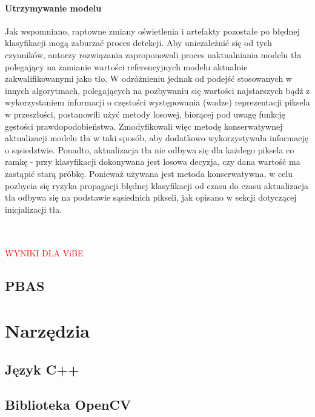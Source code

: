 \paragraph{Utrzymywanie modelu \\}
Jak wspomniano, raptowne zmiany oświetlenia i artefakty pozostałe po błędnej klasyfikacji mogą zaburzać proces detekcji. Aby uniezależnić się od tych czynników, autorzy rozwiązania zaproponowali proces uaktualniania modelu tła polegający na zamianie wartości referencyjnych modelu aktualnie zakwalifikowanymi jako tło. W odróżnieniu jednak od podejść stosowanych w innych algorytmach, polegających na pozbywaniu się wartości najstarszych bądź z wykorzystaniem informacji o częstości występowania (wadze) reprezentacji piksela w przeszłości, postanowili użyć metody losowej, biorącej pod uwagę funkcję gęstości prawdopodobieństwa. Zmodyfikowali więc metodę konserwatywnej aktualizacji modelu tła w taki sposób, aby dodatkowo wykorzystywała informację o sąsiedztwie. Ponadto, aktualizacja tła nie odbywa się dla każdego piksela co ramkę - przy klasyfikacji dokonywana jest losowa decyzja, czy dana wartość ma zastąpić starą próbkę. Ponieważ używana jest metoda konserwatywna, w celu pozbycia się ryzyka propagacji błędnej klasyfikacji od czasu do czasu aktualizacja tła odbywa się na podstawie sąsiednich pikseli, jak opisano w sekcji dotyczącej inicjalizacji tła.\\ \\ \\
\begin{LARGE}
\textcolor{red}{WYNIKI DLA ViBE}
\end{LARGE}
\subsection{PBAS}
\cite{hofmann2012background}
\section{Narzędzia}
\subsection{Język C++}
\subsection{Biblioteka OpenCV}

